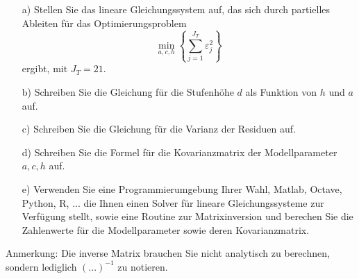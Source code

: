\begin{itemize}
	\item[a)] Stellen Sie das lineare Gleichungssystem auf, das sich durch partielles Ableiten
	für das Optimierungsproblem
	$$
	\min\limits_{a,c,h} \left\{\sum_{j=1}^{J_T} \varepsilon_j^2\right\}
	$$
	ergibt, mit $J_T = 21$.
	\item[b)] Schreiben Sie die Gleichung für die Stufenhöhe $d$ als Funktion von $h$ und $a$ auf.
	\item[c)] Schreiben Sie die Gleichung für die Varianz der Residuen auf.
	\item[d)] Schreiben Sie die Formel für die Kovarianzmatrix der Modellparameter
	$a, c, h$ auf.
	\item[e)] Verwenden Sie eine Programmierumgebung Ihrer Wahl, Matlab, Octave, Python, R, ...
	die Ihnen einen Solver für lineare Gleichungssysteme zur Verfügung stellt, sowie
	eine Routine zur Matrixinversion und berechen Sie die Zahlenwerte für die Modellparameter
	sowie deren Kovarianzmatrix.
\end{itemize}
Anmerkung: Die inverse Matrix brauchen Sie nicht analytisch zu berechnen, sondern
	lediglich $(...)^{-1}$ zu notieren.
